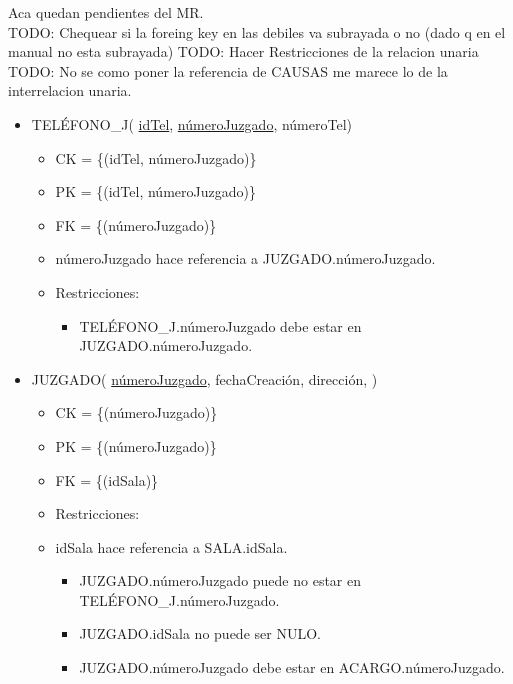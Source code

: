 Aca quedan pendientes del MR.\\

TODO: Chequear si la foreing key en las debiles va subrayada o no (dado q en el manual no esta subrayada)
TODO: Hacer Restricciones de la relacion unaria \\
TODO: No se como poner la referencia de CAUSAS me marece lo de la interrelacion unaria.
\begin{itemize}

\item TELÉFONO\_J( \underline{idTel}, \underline{númeroJuzgado}, númeroTel) 
	\begin{itemize}
		\item CK = \{(idTel, númeroJuzgado)\}
		\item PK = \{(idTel, númeroJuzgado)\}
		\item FK = \{(númeroJuzgado)\}
		\item númeroJuzgado hace referencia a JUZGADO.númeroJuzgado.
		\item Restricciones:
			\begin{itemize}
			\item  TELÉFONO\_J.númeroJuzgado debe estar en JUZGADO.númeroJuzgado.
			\\
			
			\end{itemize}
	\end{itemize}	

	
\item JUZGADO( \underline{númeroJuzgado}, fechaCreación, dirección, )
	\begin{itemize}
		\item CK = \{(númeroJuzgado)\}
		\item PK = \{(númeroJuzgado)\}
		\item FK = \{(idSala)\}
		\item Restricciones:
		\item idSala hace referencia a SALA.idSala.
			\begin{itemize}
			\item JUZGADO.númeroJuzgado puede no estar en TELÉFONO\_J.númeroJuzgado.
			\item JUZGADO.idSala no puede ser NULO.
			\item JUZGADO.númeroJuzgado debe estar en ACARGO.númeroJuzgado.
			\\
			\end{itemize}
	\end{itemize}



\end{itemize}
